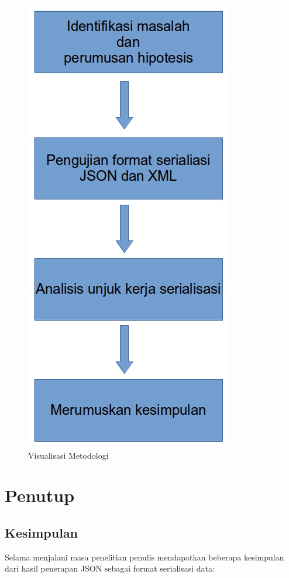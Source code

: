 \documentclass{llncs}
\begin{document}
\onehalfspacing
\begin{figure}[htp]
\centering
\includegraphics[scale=0.45]{images/visualisasi-metodologi.png}
\caption{Visualisasi Metodologi}
\label{visualisasi-metodologi}
\end{figure}

\section{Penutup}

\subsection{Kesimpulan}

Selama menjalani masa penelitian penulis mendapatkan beberapa kesimpulan dari hasil penerapan JSON sebagai format serialisasi data:
\end{document}
